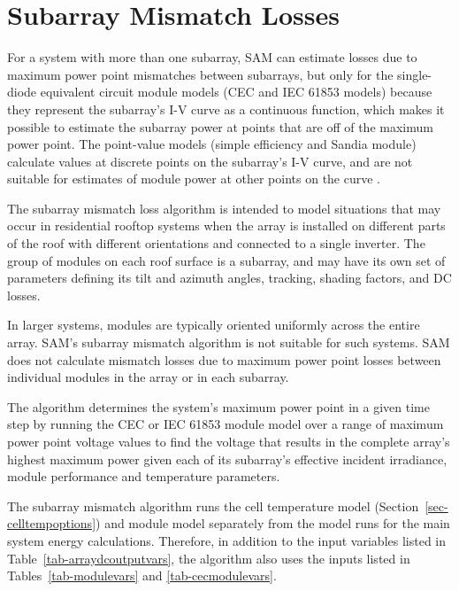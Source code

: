 \documentclass[12pt,letterpaper]{article}
\begin{document}
\section{Subarray Mismatch Losses}\label{sec-mismatch}

For a system with more than one subarray, SAM can estimate losses due to maximum power point mismatches between subarrays, but only for the single-diode equivalent circuit module models (CEC and IEC 61853 models) because they represent the subarray's I-V curve as a continuous function, which makes it possible to estimate the subarray power at points that are off of the maximum power point. The point-value models (simple efficiency and Sandia module) calculate values at discrete points on the subarray's I-V curve, and are not suitable for estimates of module power at other points on the curve \citep{dobos2012b}.

The subarray mismatch loss algorithm \citep{dobos2012b} is intended to model situations that may occur in residential rooftop systems when the array is installed on different parts of the roof with different orientations and connected to a single inverter. The group of modules on each roof surface is a subarray, and may have its own set of parameters defining its tilt and azimuth angles, tracking, shading factors, and DC losses. 

In larger systems, modules are typically oriented uniformly across the entire array. SAM's subarray mismatch algorithm is not suitable for such systems. SAM does not calculate mismatch losses due to maximum power point losses between individual modules in the array or in each subarray.

The algorithm determines the system's maximum power point in a given time step by running the CEC or IEC 61853 module model over a range of maximum power point voltage values to find the voltage that results in the complete array's highest maximum power given each of its subarray's effective incident irradiance, module performance and temperature parameters.

The subarray mismatch algorithm runs the cell temperature model (Section~\ref{sec-celltempoptions}) and module model separately from the model runs for the main system energy calculations. Therefore, in addition to the input variables listed in Table~\ref{tab-arraydcoutputvars}, the algorithm also uses the inputs listed in Tables~\ref{tab-modulevars} and \ref{tab-cecmodulevars}.

\end{document}
